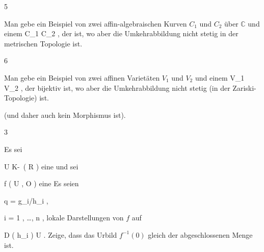 {5}
{





Man gebe ein Beispiel von zwei affin-algebraischen Kurven $C_1$ und $C_2$ über $\mathbb C$ und einem 
\maabbdisp {{\psi}} { C_1 } { C_2
} {,}
der
ist, wo aber die Umkehrabbildung nicht stetig in der metrischen Topologie ist.





}
{} {}

{6}
{





Man gebe ein Beispiel von zwei
affinen Varietäten $V_1$ und $V_2$ und einem
\maabbdisp {{\psi}} {V_1 } { V_2
} {,}
der bijektiv ist, wo aber die Umkehrabbildung nicht stetig (in der Zariski-Topologie) ist.





}
{(und daher auch kein Morphismus ist).} {}

{3}
{





Es sei

\mavergleichskette
{\vergleichskette
{ U
}
{ \subseteq }{ K\!-\!\, \left(   R   \right)
}
{  }{
}
{    }{
}
{   }{
}
}
{}{}{}
eine
und sei

\mavergleichskette
{\vergleichskette
{ f
}
{ \in }{ \Gamma ( U , {\mathcal O} )
}
{  }{
}
{    }{
}
{   }{
}
}
{}{}{}
eine
Es seien

\mavergleichskette
{\vergleichskette
{ q
}
{ = }{ g_i/h_i
}
{  }{
}
{    }{
}
{   }{
}
}
{}{}{,}

\mavergleichskette
{\vergleichskette
{ i
}
{ = }{ 1 , \ldots ,  n
}
{  }{
}
{    }{
}
{   }{}
}
{}{}{,}
lokale Darstellungen von $f$ auf

\mavergleichskette
{\vergleichskette
{ D \left(  h_i  \right)
}
{ \subseteq }{ U
}
{  }{
}
{    }{
}
{   }{
}
}
{}{}{}
 {} {.}
Zeige, dass das Urbild $f^{-1}(0)$ gleich der abgeschlossenen Menge
 ist.





}
{} {}
